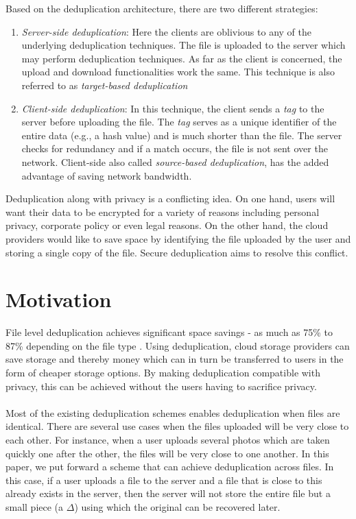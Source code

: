 Based on the deduplication architecture, there are two different strategies:
\begin{enumerate}
	\item \textit{Server-side deduplication}: Here the clients are oblivious to any of the
	underlying deduplication techniques. The file is uploaded to the server which
	may perform deduplication techniques. As far as the client is concerned, the upload and download
	functionalities work the same. This technique is also referred to as 
	\textit{target-based deduplication}
	
	\item \textit{Client-side deduplication}: In this technique, the client sends a \textit{tag}
	to the server before uploading the file. The \textit{tag} serves as a unique identifier of
	the entire data (e.g., a hash value) and is much shorter than the file. The server checks for
	redundancy and if a match occurs, the file is not sent over the network. Client-side also called
	\textit{source-based deduplication}, has the added advantage of saving network bandwidth.
\end{enumerate}
Deduplication along with privacy is a conflicting idea. On one hand, users will want
their data to be encrypted for a variety of reasons including personal privacy, corporate policy or
even legal reasons. On the other hand, 
the cloud providers would like to save space by identifying the file uploaded by 
the user and storing a single copy of the file.
Secure deduplication aims to resolve this conflict.	

\section{Motivation}
File level deduplication achieves significant space savings - as much as 75\% to 87\% depending 
on the file type \cite{practicaldedup}. Using deduplication,
cloud storage providers can save storage and thereby money which can in turn be transferred to
users in the form of cheaper storage options. By making deduplication compatible with privacy,
this can be achieved without the users having to sacrifice privacy.
\\ \\
Most of the existing deduplication schemes enables deduplication when files are identical. There
are several use cases when the files uploaded will be very close to each other. For instance, 
when a user uploads several photos which are taken quickly one after the other, the files
will be very close to one another. In this
paper, we put forward a scheme that can achieve deduplication across files. In this case, if a user
uploads a file to the server and a file that is close to this already exists in the server,
then the server will not store the entire file but a small piece (a $\Delta$) 
using which the original can be recovered later.


